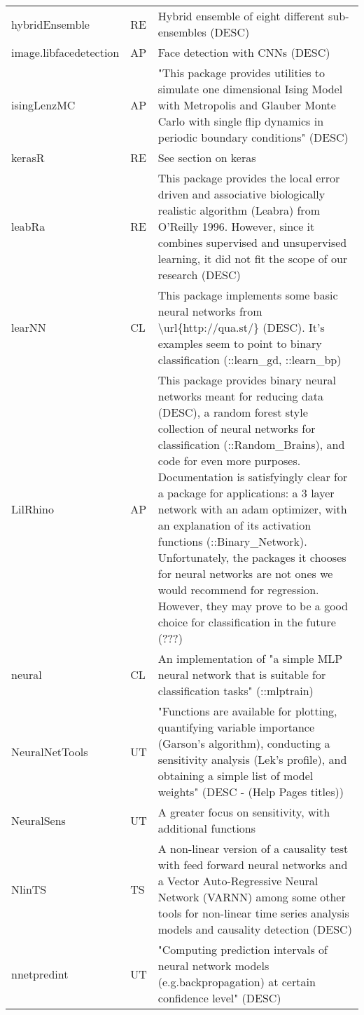 \begin{Schunk}
\begin{longtable}[t]{ll>{\raggedright\arraybackslash}p{10cm}}
hybridEnsemble & RE & Hybrid ensemble of eight different sub-ensembles (DESC)\\
\addlinespace
image.libfacedetection & AP & Face detection with CNNs (DESC)\\
isingLenzMC & AP & "This package provides utilities to simulate one dimensional Ising Model with Metropolis and Glauber Monte Carlo with single flip dynamics in periodic boundary conditions" (DESC)\\
kerasR & RE & See section on keras\\
leabRa & RE & This package provides the local error driven and associative biologically realistic algorithm (Leabra) from O'Reilly 1996. However, since it combines supervised and unsupervised learning, it did not fit the scope of our research (DESC)\\
learNN & CL & This package implements some basic neural networks from \textbackslash{}url\{http://qua.st/\} (DESC). It's examples seem to point to binary classification (::learn\_gd, ::learn\_bp)\\
\addlinespace
LilRhino & AP & This package provides binary neural networks meant for reducing data (DESC), a random forest style collection of neural networks for classification (::Random\_Brains), and code for even more purposes. Documentation is satisfyingly clear for a package for applications: a 3 layer network with an adam optimizer, with an explanation of its activation functions (::Binary\_Network). Unfortunately, the packages it chooses for neural networks are not ones we would recommend for regression. However, they may prove to be a good choice for classification in the future (???)\\
neural & CL & An implementation of "a simple MLP neural network that is suitable for classification tasks" (::mlptrain)\\
NeuralNetTools & UT & "Functions are available for plotting, quantifying variable importance (Garson's algorithm), conducting a sensitivity analysis (Lek's profile), and obtaining a simple list of model weights" (DESC - (Help Pages titles))\\
NeuralSens & UT & A greater focus on sensitivity, with additional functions\\
NlinTS & TS & A non-linear version of a causality test with feed forward neural networks and a Vector Auto-Regressive Neural Network (VARNN) among some other tools for non-linear time series analysis models and causality detection (DESC)\\
\addlinespace
nnetpredint & UT & "Computing prediction intervals of neural network models (e.g.backpropagation) at certain confidence level" (DESC)\\

\end{longtable}
\end{Schunk}
